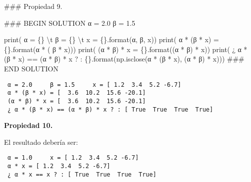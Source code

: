 \documentclass[
  letterpaper,
  DIV=11,
  numbers=noendperiod]{scrreprt}
\newenvironment{Shaded}{\begin{snugshade}}{\end{snugshade}}
\newcommand{\BuiltInTok}[1]{\textcolor[rgb]{0.00,0.23,0.31}{#1}}
\newcommand{\CharTok}[1]{\textcolor[rgb]{0.13,0.47,0.30}{#1}}
\newcommand{\CommentTok}[1]{\textcolor[rgb]{0.37,0.37,0.37}{#1}}
\newcommand{\FloatTok}[1]{\textcolor[rgb]{0.68,0.00,0.00}{#1}}
\newcommand{\NormalTok}[1]{\textcolor[rgb]{0.00,0.23,0.31}{#1}}
\newcommand{\OperatorTok}[1]{\textcolor[rgb]{0.37,0.37,0.37}{#1}}
\newcommand{\RegionMarkerTok}[1]{\textcolor[rgb]{0.00,0.23,0.31}{#1}}
\newcommand{\SpecialCharTok}[1]{\textcolor[rgb]{0.37,0.37,0.37}{#1}}
\newcommand{\StringTok}[1]{\textcolor[rgb]{0.13,0.47,0.30}{#1}}
\begin{document}
\begin{Shaded}
\begin{Highlighting}[]
\CommentTok{\#\#\# Propiedad 9.}

\CommentTok{\#\#\# }\RegionMarkerTok{BEGIN}\CommentTok{ SOLUTION}
\NormalTok{α }\OperatorTok{=} \FloatTok{2.0}
\NormalTok{β }\OperatorTok{=} \FloatTok{1.5}

\BuiltInTok{print}\NormalTok{(}\StringTok{\textquotesingle{} α = }\SpecialCharTok{\{\}}\StringTok{ }\CharTok{\textbackslash{}t}\StringTok{ β = }\SpecialCharTok{\{\}}\StringTok{ }\CharTok{\textbackslash{}t}\StringTok{ x = }\SpecialCharTok{\{\}}\StringTok{\textquotesingle{}}\NormalTok{.}\BuiltInTok{format}\NormalTok{(α, β, x))}
\BuiltInTok{print}\NormalTok{(}\StringTok{\textquotesingle{} α * (β * x) = }\SpecialCharTok{\{\}}\StringTok{\textquotesingle{}}\NormalTok{.}\BuiltInTok{format}\NormalTok{(α }\OperatorTok{*}\NormalTok{ ( β }\OperatorTok{*}\NormalTok{ x)))}
\BuiltInTok{print}\NormalTok{(}\StringTok{\textquotesingle{} (α * β) * x = }\SpecialCharTok{\{\}}\StringTok{\textquotesingle{}}\NormalTok{.}\BuiltInTok{format}\NormalTok{((α }\OperatorTok{*}\NormalTok{ β) }\OperatorTok{*}\NormalTok{ x))}
\BuiltInTok{print}\NormalTok{(}\StringTok{\textquotesingle{} ¿ α * (β * x) == (α * β) * x ? : }\SpecialCharTok{\{\}}\StringTok{\textquotesingle{}}\NormalTok{.}\BuiltInTok{format}\NormalTok{(np.isclose(α }\OperatorTok{*}\NormalTok{ (β }\OperatorTok{*}\NormalTok{ x), (α }\OperatorTok{*}\NormalTok{ β) }\OperatorTok{*}\NormalTok{ x)))}
\CommentTok{\#\#\# }\RegionMarkerTok{END}\CommentTok{ SOLUTION}
\end{Highlighting}
\end{Shaded}

\begin{verbatim}
 α = 2.0     β = 1.5     x = [ 1.2  3.4  5.2 -6.7]
 α * (β * x) = [  3.6  10.2  15.6 -20.1]
 (α * β) * x = [  3.6  10.2  15.6 -20.1]
 ¿ α * (β * x) == (α * β) * x ? : [ True  True  True  True]
\end{verbatim}

\textbf{Propiedad 10.}

El resultado debería ser:

\begin{verbatim}
 α = 1.0     x = [ 1.2  3.4  5.2 -6.7]
 α * x = [ 1.2  3.4  5.2 -6.7]
 ¿ α * x == x ? : [ True  True  True  True]
\end{verbatim}
\end{document}
